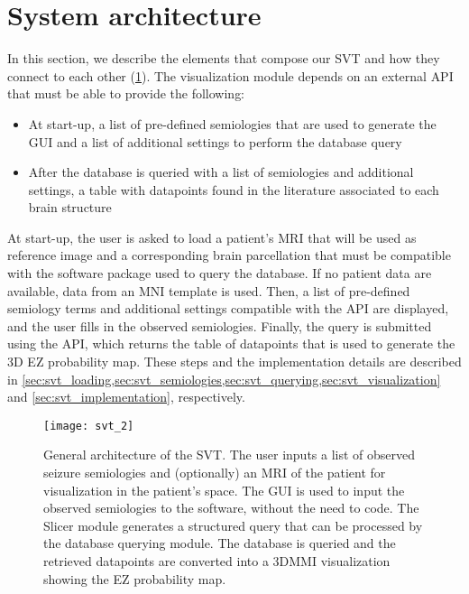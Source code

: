 \section{System architecture}

In this section, we describe the elements that compose our \ac{SVT} and how they connect to each other (\cref{fig:svt_architecture}).
The visualization module depends on an external \ac{API} that must be able to provide the following:
\begin{itemize}
  \item At start-up, a list of pre-defined semiologies that are used to generate the \ac{GUI} and a list of additional settings to perform the database query
  \item After the database is queried with a list of semiologies and additional settings, a table with datapoints found in the literature associated to each brain structure
\end{itemize}

At start-up, the user is asked to load a patient's \ac{MRI} that will be used as reference image and a corresponding brain parcellation that must be compatible with the software package used to query the database.
If no patient data are available, data from an \ac{MNI} template is used.
Then, a list of pre-defined semiology terms and additional settings compatible with the \ac{API} are displayed, and the user fills in the observed semiologies.
Finally, the query is submitted using the \ac{API}, which returns the table of datapoints that is used to generate the 3D \ac{EZ} probability map.
These steps and the implementation details are described in \cref{sec:svt_loading,sec:svt_semiologies,sec:svt_querying,sec:svt_visualization} and \cref{sec:svt_implementation}, respectively.

\begin{figure}
  \centering
  \texttt{[image: svt\_2]}
  \caption[General architecture of the Semiology Visualization Tool]{
    General architecture of the \ac{SVT}.
    The user inputs a list of observed seizure semiologies and (optionally) an \ac{MRI} of the patient for visualization in the patient's space.
    The \ac{GUI} is used to input the observed semiologies to the software, without the need to code.
    The Slicer module generates a structured query that can be processed by the database querying module.
    The database is queried and the retrieved datapoints are converted into a \ac{3DMMI} visualization showing the \ac{EZ} probability map.
  }
  \label{fig:svt_architecture}
\end{figure}


